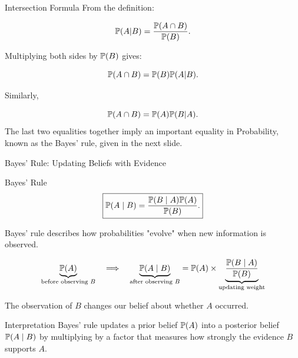 \begin{frame}{Intersection Formula}
From the definition:

\[
\mathbb{P}(A|B)
=
\frac{\mathbb{P}(A\cap B)}{\mathbb{P}(B)}.
\]

Multiplying both sides by $\mathbb{P}(B)$ gives:

\[
{
\mathbb{P}(A\cap B)
=
\mathbb{P}(B)\mathbb{P}(A|B).
}
\]

Similarly,

\[
\mathbb{P}(A\cap B)
=
\mathbb{P}(A)\mathbb{P}(B|A).
\]
The last two equalities together imply an important equality in Probability, known as the Bayes' rule, given in the next slide.
\end{frame}
\begin{frame}{Bayes' Rule: Updating Beliefs with Evidence}

\begin{keybox}{Bayes' Rule}
\[
\boxed{
\mathbb{P}(A\mid B)
=
\frac{\mathbb{P}(B\mid A)\mathbb{P}(A)}
{\mathbb{P}(B)}.
}
\]
\end{keybox}

Bayes' rule describes how probabilities "evolve" when new information is observed.

\begin{center}
\[
\underbrace{\mathbb{P}(A)}_{\text{before observing }B}
\quad
\Longrightarrow
\quad
\underbrace{\mathbb{P}(A\mid B)}_{\text{after observing }B}
=
\mathbb{P}(A)
\times
\underbrace{
\frac{\mathbb{P}(B\mid A)}{\mathbb{P}(B)}
}_{\text{updating weight}}
\]
\end{center}

The observation of $B$ changes our belief about whether $A$ occurred.

\begin{keybox}{Interpretation}
Bayes' rule updates a prior belief $\mathbb{P}(A)$ into a posterior belief $\mathbb{P}(A\mid B)$ by multiplying by a factor that measures how strongly the evidence $B$ supports $A$.
\end{keybox}

\end{frame}

